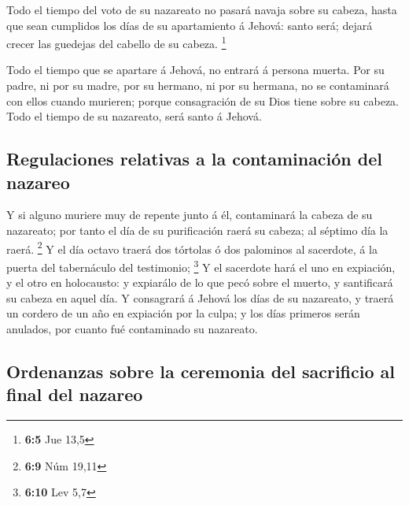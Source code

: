  Todo el tiempo del voto de su nazareato no pasará navaja
sobre su cabeza, hasta que sean cumplidos los días de su apartamiento á
Jehová: santo será; dejará crecer las guedejas del cabello de su cabeza.
\footnote{\textbf{6:5} Jue 13,5}

 Todo el tiempo que se apartare á Jehová, no entrará á
persona muerta.  Por su padre, ni por su madre, por su
hermano, ni por su hermana, no se contaminará con ellos cuando murieren;
porque consagración de su Dios tiene sobre su cabeza. 
Todo el tiempo de su nazareato, será santo á Jehová.

\hypertarget{regulaciones-relativas-a-la-contaminaciuxf3n-del-nazareo}{%
\subsection{Regulaciones relativas a la contaminación del
nazareo}\label{regulaciones-relativas-a-la-contaminaciuxf3n-del-nazareo}}

 Y si alguno muriere muy de repente junto á él,
contaminará la cabeza de su nazareato; por tanto el día de su
purificación raerá su cabeza; al séptimo día la raerá. \footnote{\textbf{6:9}
  Núm 19,11}  Y el día octavo traerá dos tórtolas ó dos
palominos al sacerdote, á la puerta del tabernáculo del testimonio;
\footnote{\textbf{6:10} Lev 5,7}  Y el sacerdote hará el
uno en expiación, y el otro en holocausto: y expiarálo de lo que pecó
sobre el muerto, y santificará su cabeza en aquel día.  Y
consagrará á Jehová los días de su nazareato, y traerá un cordero de un
año en expiación por la culpa; y los días primeros serán anulados, por
cuanto fué contaminado su nazareato.

\hypertarget{ordenanzas-sobre-la-ceremonia-del-sacrificio-al-final-del-nazareo}{%
\subsection{Ordenanzas sobre la ceremonia del sacrificio al final del
nazareo}\label{ordenanzas-sobre-la-ceremonia-del-sacrificio-al-final-del-nazareo}}

